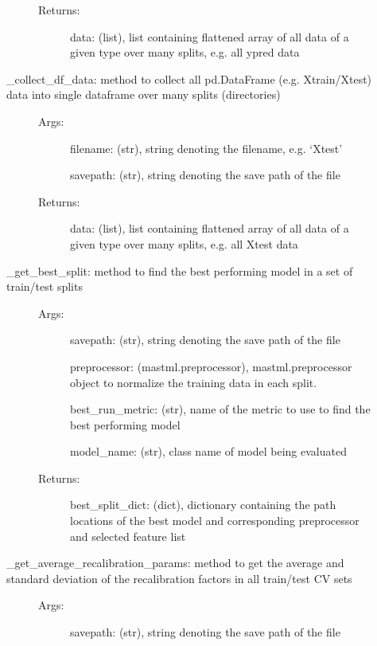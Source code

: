 \documentclass[letterpaper,10pt,english]{sphinxmanual}
\begin{document}
\begin{fulllineitems}
\begin{description}
\begin{description}
\begin{description}
\item[{Returns:}] \leavevmode
data: (list), list containing flattened array of all data of a given type over many splits, e.g. all ypred data

\end{description}

\item[{\_collect\_df\_data: method to collect all pd.DataFrame (e.g. Xtrain/Xtest) data into single dataframe over many splits (directories)}] \leavevmode\begin{description}
\item[{Args:}] \leavevmode
filename: (str), string denoting the filename, e.g. ‘Xtest’

savepath: (str), string denoting the save path of the file

\item[{Returns:}] \leavevmode
data: (list), list containing flattened array of all data of a given type over many splits, e.g. all Xtest data

\end{description}

\item[{\_get\_best\_split: method to find the best performing model in a set of train/test splits}] \leavevmode\begin{description}
\item[{Args:}] \leavevmode
savepath: (str), string denoting the save path of the file

preprocessor: (mastml.preprocessor), mastml.preprocessor object to normalize the training data in each split.

best\_run\_metric: (str), name of the metric to use to find the best performing model

model\_name: (str), class name of model being evaluated

\item[{Returns:}] \leavevmode
best\_split\_dict: (dict), dictionary containing the path locations of the best model and corresponding preprocessor and selected feature list

\end{description}

\item[{\_get\_average\_recalibration\_params: method to get the average and standard deviation of the recalibration factors in all train/test CV sets}] \leavevmode\begin{description}
\item[{Args:}] \leavevmode
savepath: (str), string denoting the save path of the file


\end{description}
\end{description}
\end{description}
\end{fulllineitems}
\end{document}
